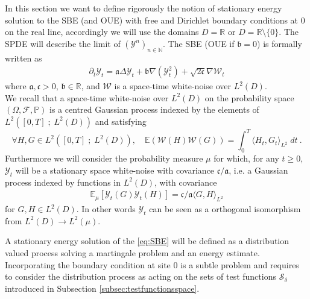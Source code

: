 \documentclass[a4paper, reqno, 12pt]{amsart}
\theoremstyle{plain}
\theoremstyle{definition}
\newcommand{\R}{\mathbb{R}}
\newcommand{\N}{\mathbb{N}}
\begin{document}
 In this section we want to define rigorously the notion of stationary energy solution to the SBE (and OUE) with free and Dirichlet 
boundary conditions at $0$ on the real line, accordingly we will use the domains $D= \R$ or $D=\R\setminus\{0\}$. The SPDE will describe the limit of $(\mathcal  Y^n)_{n\in\N}$. 
The SBE (OUE if $\mathfrak b =0$) is formally written as
\begin{align} 
\tag{SBE}
\label{eq:SBE}
    \partial_t\mathcal{Y}_t = \mathfrak{a}\Delta\mathcal{Y}_t + \mathfrak{b} \nabla(\mathcal{Y}_t^2) + \sqrt{2\mathfrak{c}} \nabla {\mathcal W}_t
\end{align}
where $\mathfrak a, \mathfrak c >0$, $\mathfrak b \in\mathbb{R}$, and $\mathcal W$ is a space-time white-noise over $L^2(D)$. \\
We recall that a space-time white-noise over $L^2(D)$ on the probability space $(\Omega,\mathcal F,\mathbb P)$ is a centred Gaussian process indexed by the elements of $L^2 ([0,T] \; ; \;  L^2 (D))$ and satisfying 
\begin{equation*}
    \forall H,G \in L^2 ([0,T] \; ; \;  L^2 (D)), \quad \mathbb E ( \mathcal W (H) \mathcal W (G)) = \int_0^T \langle H_t , G_t \rangle_{L^2} \; dt \ .
\end{equation*}
Furthermore we will consider the probability measure $\mu$ for which, for any $t\ge 0$, $\mathcal Y_t$ will be a stationary space white-noise with covariance $\mathfrak c/\mathfrak a$, i.e. a Gaussian process indexed by functions in $L^2(D)$, with covariance 
\begin{align} \label{eq:spacewn}
    \mathbb{E}_{\mu} [\mathcal Y_t(G)\mathcal Y_t(H)] = \mathfrak c/\mathfrak a \langle G,H\rangle_{L^2} 
\end{align}
for $G,H\in L^2(D)$. In other words $\mathcal Y_t$ can be seen as a orthogonal isomorphism from $L^2(D) \to L^2(\mu)$. 



\medskip

A stationary energy solution of the \eqref{eq:SBE} will be defined as a distribution valued process solving a martingale problem and an energy estimate. Incorporating the boundary condition at site $0$ is a subtle problem and requires to consider the distribution process as acting on the sets of test functions  $\mathcal S_\delta$ introduced in Subsection \ref{subsec:testfunctionsspace}. 
\end{document}
